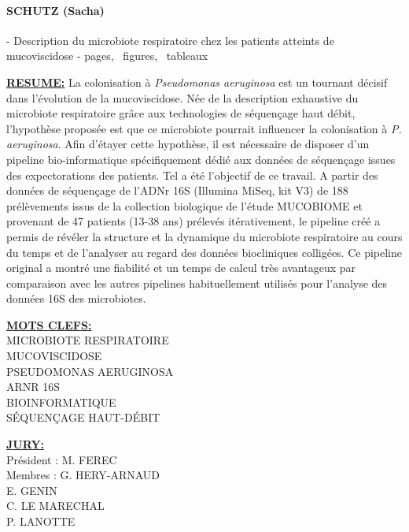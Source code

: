 \documentclass[12pt,a4paper]{article}
\begin{document}
{{\noindent
\centering

\begin{minipage}[t][2cm]{15cm}
\paragraph{SCHUTZ (Sacha)} - Description du microbiote respiratoire chez les patients atteints de mucoviscidose - \pageref{LastPage} pages, \totalfigures\ figures, \totaltables\ tableaux \\
\end{minipage}


\begin{minipage}[t][9.5cm]{15cm}
\textbf{\underline{RESUME:}}
La colonisation à \textit{Pseudomonas aeruginosa} est un tournant décisif dans l'évolution de la mucoviscidose. Née de la description exhaustive du microbiote respiratoire grâce aux technologies de séquençage haut débit, l'hypothèse proposée est que ce microbiote pourrait influencer la colonisation à \textit{P. aeruginosa}. Afin d'étayer cette hypothèse, il est nécessaire de disposer d'un pipeline bio-informatique spécifiquement dédié aux données de séquençage issues des expectorations des patients. Tel a été l'objectif de ce travail. A partir des données de séquençage de l'ADNr 16S (Illumina MiSeq, kit V3) de 188 prélèvements issus de la collection biologique de l'étude MUCOBIOME et provenant de 47 patients (13-38 ans) prélevés itérativement, le pipeline créé a permis de révéler la structure et la dynamique du microbiote respiratoire au cours du temps et de l'analyser au regard des données biocliniques colligées. Ce pipeline original a montré une fiabilité et un temps de calcul très avantageux par comparaison avec les autres pipelines habituellement utilisés pour l'analyse des données 16S des microbiotes.  
 \end{minipage}


\begin{minipage}[t][4.9cm]{15cm}
\textbf{\underline{MOTS CLEFS:}} \\
MICROBIOTE RESPIRATOIRE\\
MUCOVISCIDOSE\\
PSEUDOMONAS AERUGINOSA\\
ARNR 16S\\
BIOINFORMATIQUE\\
SÉQUENÇAGE HAUT-DÉBIT\\
 \end{minipage}



\begin{minipage}[t][5cm]{15cm}
\textbf{\underline{JURY:}} \\
 Président : M. FEREC \\ 
 Membres  :  G. HERY-ARNAUD \\
 \hspace*{1.9cm} E. GENIN\\
 \hspace*{1.9cm} C. LE MARECHAL\\
 \hspace*{1.9cm} P. LANOTTE\\


\end{minipage}}}
\end{document}
